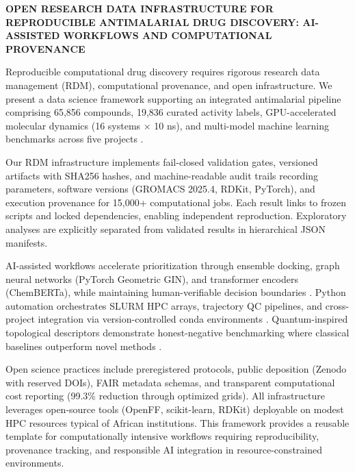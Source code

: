\documentclass[12pt,a4paper]{article}
\begin{document}
	\begin{center}
		{\large{\bf OPEN RESEARCH DATA INFRASTRUCTURE FOR REPRODUCIBLE ANTIMALARIAL DRUG DISCOVERY: AI-ASSISTED WORKFLOWS AND COMPUTATIONAL PROVENANCE} }
		\\
		
	\end{center}
	
	\noindent
	Reproducible computational drug discovery requires rigorous research data management (RDM), computational provenance, and open infrastructure. We present a data science framework supporting an integrated antimalarial pipeline comprising 65,856 compounds, 19,836 curated activity labels, GPU-accelerated molecular dynamics (16 systems $\times$ 10 ns), and multi-model machine learning benchmarks across five projects \cite{sao2026rrs}.
	
	Our RDM infrastructure implements fail-closed validation gates, versioned artifacts with SHA256 hashes, and machine-readable audit trails recording parameters, software versions (GROMACS 2025.4, RDKit, PyTorch), and execution provenance for 15,000+ computational jobs. Each result links to frozen scripts and locked dependencies, enabling independent reproduction. Exploratory analyses are explicitly separated from validated results in hierarchical JSON manifests.
	
	AI-assisted workflows accelerate prioritization through ensemble docking, graph neural networks (PyTorch Geometric GIN), and transformer encoders (ChemBERTa), while maintaining human-verifiable decision boundaries \cite{sao2026gnn}. Python automation orchestrates SLURM HPC arrays, trajectory QC pipelines, and cross-project integration via version-controlled conda environments \cite{sao2026quantum}. Quantum-inspired topological descriptors demonstrate honest-negative benchmarking where classical baselines outperform novel methods \cite{sao2026mcts}.
	
	Open science practices include preregistered protocols, public deposition (Zenodo with reserved DOIs), FAIR metadata schemas, and transparent computational cost reporting (99.3\% reduction through optimized grids). All infrastructure leverages open-source tools (OpenFF, scikit-learn, RDKit) deployable on modest HPC resources typical of African institutions. This framework provides a reusable template for computationally intensive workflows requiring reproducibility, provenance tracking, and responsible AI integration in resource-constrained environments.
	
\end{document}
